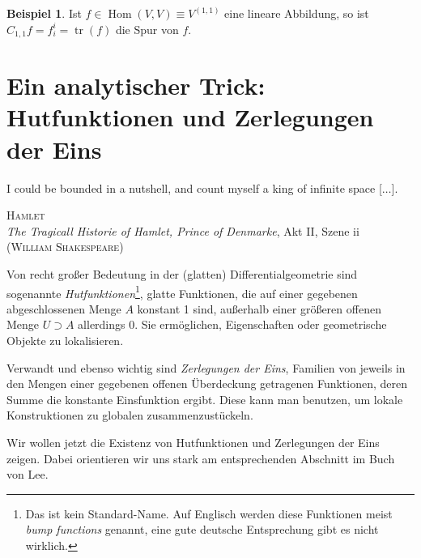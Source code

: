 \documentclass[a4paper]{scrbook}
\numberwithin{equation}{chapter}
\DeclareMathOperator{\tr}{tr}
\DeclareMathOperator{\Hom}{Hom}
\theoremstyle{definition}
\newtheorem{bsp}[defn]{Beispiel}
\begin{document}
\begin{bsp}
	Ist $f \in \Hom(V,V) \equiv V^{(1,1)}$ eine lineare Abbildung, so ist $C_{1,1}f = f^i_i = \tr(f)$ die Spur von $f$.
\end{bsp}


\chapter{Ein analytischer Trick: Hutfunktionen und Zerlegungen der Eins}
\epigraph{I could be bounded in a nutshell, and count myself a king of infinite space [$\ldots$].}{\textsc{Hamlet}\\\emph{The Tragicall Historie of Hamlet, Prince of Denmarke}, Akt II, Szene ii\\(\textsc{William Shakespeare})}

Von recht großer Bedeutung in der (glatten) Differentialgeometrie sind sogenannte \emph{Hutfunktionen}\footnote{Das ist kein Standard-Name. Auf Englisch werden diese Funktionen meist \emph{bump functions}  genannt, eine gute deutsche Entsprechung gibt es nicht wirklich.}, glatte Funktionen, die auf einer gegebenen abgeschlossenen Menge $A$ konstant 1 sind, außerhalb einer größeren offenen Menge $U \supset A$ allerdings 0. Sie ermöglichen, Eigenschaften oder geometrische Objekte zu \glqq lokalisieren\grqq.

Verwandt und ebenso wichtig sind \emph{Zerlegungen der Eins}, Familien von jeweils in den Mengen einer gegebenen offenen Überdeckung getragenen Funktionen, deren Summe die konstante Einsfunktion ergibt. Diese kann man benutzen, um lokale Konstruktionen zu globalen \glqq zusammenzustückeln\grqq.

Wir wollen jetzt die Existenz von Hutfunktionen und Zerlegungen der Eins zeigen. Dabei orientieren wir uns stark am entsprechenden Abschnitt im Buch von Lee.

\end{document}
